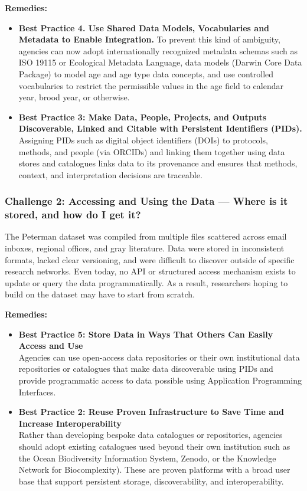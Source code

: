 \documentclass[
  letterpaper,
  DIV=11,
  numbers=noendperiod]{scrartcl}
\begin{document}
\textbf{Remedies:}

\begin{itemize}
\item
  \textbf{Best Practice 4. Use Shared Data Models, Vocabularies and
  Metadata to Enable Integration.} To prevent this kind of ambiguity,
  agencies can now adopt internationally recognized metadata schemas
  such as ISO 19115 or Ecological Metadata Language, data models (Darwin
  Core Data Package) to model age and age type data concepts, and use
  controlled vocabularies to restrict the permissible values in the age
  field to calendar year, brood year, or otherwise.
\item
  \textbf{Best Practice 3: Make Data, People, Projects, and Outputs
  Discoverable, Linked and Citable with Persistent Identifiers (PIDs).}
  Assigning PIDs such as digital object identifiers (DOIs) to protocols,
  methods, and people (via ORCIDs) and linking them together using data
  stores and catalogues links data to its provenance and ensures that
  methods, context, and interpretation decisions are traceable.
\end{itemize}

\subsubsection{Challenge 2: Accessing and Using the Data --- Where is it
stored, and how do I get
it?}\label{challenge-2-accessing-and-using-the-data-where-is-it-stored-and-how-do-i-get-it}

The Peterman dataset was compiled from multiple files scattered across
email inboxes, regional offices, and gray literature. Data were stored
in inconsistent formats, lacked clear versioning, and were difficult to
discover outside of specific research networks. Even today, no API or
structured access mechanism exists to update or query the data
programmatically. As a result, researchers hoping to build on the
dataset may have to start from scratch.

\textbf{Remedies:}

\begin{itemize}
\item
  \textbf{Best Practice 5: Store Data in Ways That Others Can Easily
  Access and Use\\
  }Agencies can use open-access data repositories or their own
  institutional data repositories or catalogues that make data
  discoverable using PIDs and provide programmatic access to data
  possible using Application Programming Interfaces.
\item
  \textbf{Best Practice 2: Reuse Proven Infrastructure to Save Time and
  Increase Interoperability\\
  }Rather than developing bespoke data catalogues or repositories,
  agencies should adopt existing catalogues used beyond their own
  institution such as the Ocean Biodiversity Information System, Zenodo,
  or the Knowledge Network for Biocomplexity). These are proven
  platforms with a broad user base that support persistent storage,
  discoverability, and interoperability.
\end{itemize}
\end{document}
